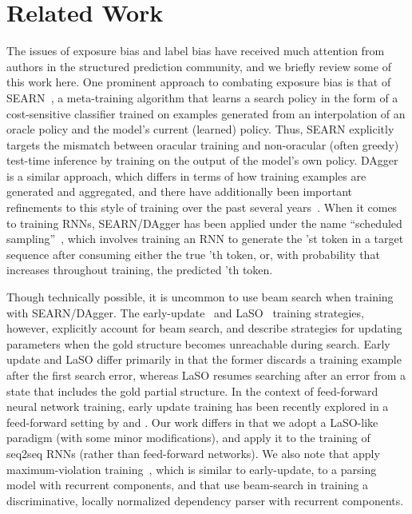 \documentclass[11pt,letterpaper]{article}
\begin{document}
%
 
\section{Related Work}
\label{sec:relatedwork}
The issues of exposure bias and label bias have received much
attention from authors in the structured prediction community, and we
briefly review some of this work here. One prominent approach to
combating exposure bias is that of SEARN~\cite{daume09search}, a
meta-training algorithm that learns a search policy in the form of a
cost-sensitive classifier trained on examples generated from an
interpolation of an oracle policy and the model's current (learned)
policy. Thus, SEARN explicitly targets the mismatch between oracular
training and non-oracular (often greedy) test-time inference by
training on the output of the model's own
policy. DAgger~\cite{ross11a} is a similar approach, which differs in
terms of how training examples are generated and aggregated, and there
have additionally been important refinements to this style of training
over the past several years~\cite{chang15efficient}. When it comes to
training RNNs, SEARN/DAgger has been applied under the name
``scheduled sampling''~\cite{bengio15scheduled}, which involves
training an RNN to generate the 'st token in a target
sequence after consuming either the true 'th token, or, with
probability that increases throughout training, the predicted 'th
token.

Though technically possible, it is uncommon to use beam search when
training with SEARN/DAgger. The
early-update~\cite{collins04incremental} and
LaSO~\cite{daume05learning} training strategies, however, explicitly
account for beam search, and describe strategies for updating
parameters when the gold structure becomes unreachable during
search. Early update and LaSO differ primarily in that the former
discards a training example after the first search error, whereas LaSO
resumes searching after an error from a state that includes the gold
partial structure. In the context of feed-forward neural network
training, early update training has been recently explored in a
feed-forward setting by  and
. Our work differs in that we adopt a
LaSO-like paradigm (with some minor modifications), and apply it to
the training of seq2seq RNNs (rather than feed-forward networks). We
also note that  apply
maximum-violation training~\cite{huang12structured}, which is similar
to early-update, to a parsing model with 
recurrent components, and that  use
beam-search in training a discriminative, locally normalized
dependency parser with recurrent components.
\end{document}
